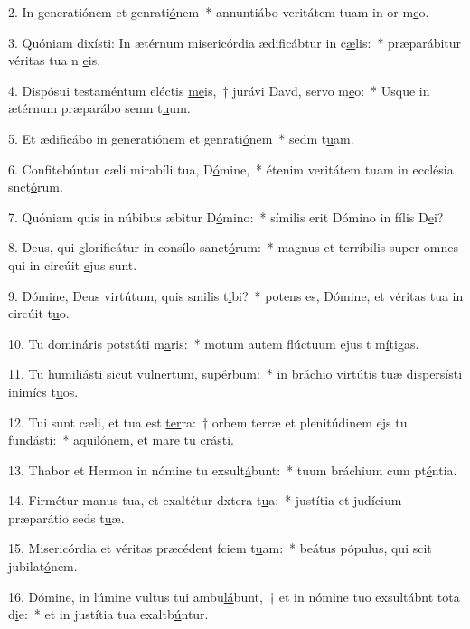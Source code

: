 2. In generatiónem et genrati\uline{ó}nem~* annuntiábo veritátem tuam in or m\uline{e}o.\par 
3. Quóniam dixísti: In ætérnum misericórdia ædificábtur in c\uline{æ}lis:~* præparábitur véritas tua n \uline{e}is.\par 
4. Dispósui testaméntum eléctis \uline{me}is,~† jurávi Davd, servo m\uline{e}o:~* Usque in ætérnum præparábo semn t\uline{u}um.\par 
5. Et ædificábo in generatiónem et genrati\uline{ó}nem~* sedm t\uline{u}am.\par 
6. Confitebúntur cæli mirabíli tua, D\uline{ó}mine,~* étenim veritátem tuam in ecclésia snct\uline{ó}rum.\par 
7. Quóniam quis in núbibus æbitur D\uline{ó}mino:~* símilis erit Dómino in fílis D\uline{e}i?\par 
8. Deus, qui glorificátur in consílo sanct\uline{ó}rum:~* magnus et terríbilis super omnes qui in circúit \uline{e}jus sunt.\par 
9. Dómine, Deus virtútum, quis smilis t\uline{i}bi?~* potens es, Dómine, et véritas tua in circúit t\uline{u}o.\par 
10. Tu domináris potstáti m\uline{a}ris:~* motum autem flúctuum ejus t m\uline{í}tigas.\par 
11. Tu humiliásti sicut vulnertum, sup\uline{é}rbum:~* in bráchio virtútis tuæ dispersísti inimícs t\uline{u}os.\par 
12. Tui sunt cæli, et tua est \uline{ter}ra:~† orbem terræ et plenitúdinem ejs tu fund\uline{á}sti:~* aquilónem, et mare tu cr\uline{á}sti.\par 
13. Thabor et Hermon in nómine tu exsult\uline{á}bunt:~* tuum bráchium cum pt\uline{é}ntia.\par 
14. Firmétur manus tua, et exaltétur dxtera t\uline{u}a:~* justítia et judícium præparátio seds t\uline{u}æ.\par 
15. Misericórdia et véritas præcédent fciem t\uline{u}am:~* beátus pópulus, qui scit jubilat\uline{ó}nem.\par 
16. Dómine, in lúmine vultus tui ambu\uline{lá}bunt,~† et in nómine tuo exsultábnt tota d\uline{i}e:~* et in justítia tua exaltb\uline{ú}ntur.\par 
